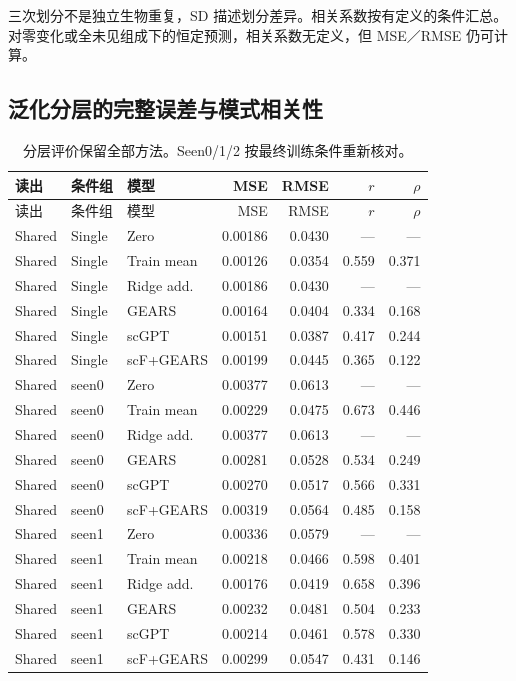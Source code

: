 三次划分不是独立生物重复，SD 描述划分差异。相关系数按有定义的条件汇总。对零变化或全未见组成下的恒定预测，相关系数无定义，但 MSE／RMSE 仍可计算。
\clearpage\subsection{泛化分层的完整误差与模式相关性}
{\footnotesize\linespread{1}\selectfont\setlength{\tabcolsep}{4pt}\renewcommand{\arraystretch}{1.08}\begin{longtable}{lllrrrr}\caption{分层评价保留全部方法。Seen0/1/2 按最终训练条件重新核对。}\\\toprule 读出 & 条件组 & 模型 & MSE & RMSE & $r$ & $\rho$\\\midrule\endfirsthead\toprule 读出 & 条件组 & 模型 & MSE & RMSE & $r$ & $\rho$\\\midrule\endhead
Shared & Single & Zero & 0.00186 & 0.0430 & --- & ---\\
Shared & Single & Train mean & 0.00126 & 0.0354 & 0.559 & 0.371\\
Shared & Single & Ridge add. & 0.00186 & 0.0430 & --- & ---\\
Shared & Single & GEARS & 0.00164 & 0.0404 & 0.334 & 0.168\\
Shared & Single & scGPT & 0.00151 & 0.0387 & 0.417 & 0.244\\
Shared & Single & scF+GEARS & 0.00199 & 0.0445 & 0.365 & 0.122\\
Shared & seen0 & Zero & 0.00377 & 0.0613 & --- & ---\\
Shared & seen0 & Train mean & 0.00229 & 0.0475 & 0.673 & 0.446\\
Shared & seen0 & Ridge add. & 0.00377 & 0.0613 & --- & ---\\
Shared & seen0 & GEARS & 0.00281 & 0.0528 & 0.534 & 0.249\\
Shared & seen0 & scGPT & 0.00270 & 0.0517 & 0.566 & 0.331\\
Shared & seen0 & scF+GEARS & 0.00319 & 0.0564 & 0.485 & 0.158\\
Shared & seen1 & Zero & 0.00336 & 0.0579 & --- & ---\\
Shared & seen1 & Train mean & 0.00218 & 0.0466 & 0.598 & 0.401\\
Shared & seen1 & Ridge add. & 0.00176 & 0.0419 & 0.658 & 0.396\\
Shared & seen1 & GEARS & 0.00232 & 0.0481 & 0.504 & 0.233\\
Shared & seen1 & scGPT & 0.00214 & 0.0461 & 0.578 & 0.330\\
Shared & seen1 & scF+GEARS & 0.00299 & 0.0547 & 0.431 & 0.146\\

\end{longtable}}
